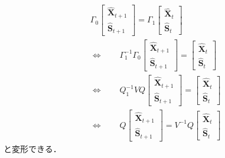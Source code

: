 \documentclass[dvipdfmx]{jlreq}
\begin{document}
\begin{equation} \label{eq:c}
  \begin{split}
    & \Gamma_0
    \begin{bmatrix}
      \widehat{\boldsymbol{X}}_{t+1} \\
      \widehat{\boldsymbol{S}}_{t+1}
    \end{bmatrix}
    = \Gamma_1
    \begin{bmatrix}
      \widehat{\boldsymbol{X}}_{t} \\
      \widehat{\boldsymbol{S}}_{t}
    \end{bmatrix} \\
    & \Leftrightarrow \qquad \Gamma_1^{-1} \Gamma_0
    \begin{bmatrix}
      \widehat{\boldsymbol{X}}_{t+1} \\
      \widehat{\boldsymbol{S}}_{t+1}
    \end{bmatrix}
    =
    \begin{bmatrix}
      \widehat{\boldsymbol{X}}_{t} \\
      \widehat{\boldsymbol{S}}_{t}
    \end{bmatrix} \\
    & \Leftrightarrow \qquad Q_1^{-1} V Q
    \begin{bmatrix}
      \widehat{\boldsymbol{X}}_{t+1} \\
      \widehat{\boldsymbol{S}}_{t+1}
    \end{bmatrix}
    =
    \begin{bmatrix}
      \widehat{\boldsymbol{X}}_{t} \\
      \widehat{\boldsymbol{S}}_{t}
    \end{bmatrix} \\
    & \Leftrightarrow \qquad Q
    \begin{bmatrix}
      \widehat{\boldsymbol{X}}_{t+1} \\
      \widehat{\boldsymbol{S}}_{t+1}
    \end{bmatrix}
    = V^{-1} Q
    \begin{bmatrix}
      \widehat{\boldsymbol{X}}_t \\
      \widehat{\boldsymbol{S}}_t
    \end{bmatrix}
  \end{split}
\end{equation}
と変形できる．
\end{document}
